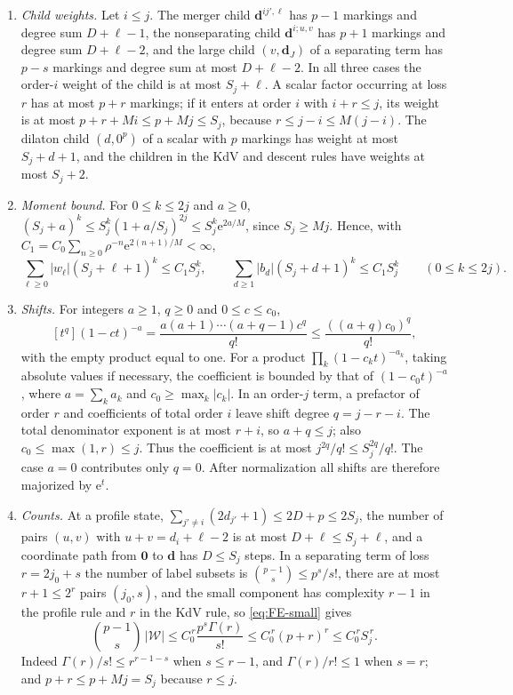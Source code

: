 \begin{enumerate}[label=(\alph*),leftmargin=*]
\item\emph{Child weights.} Let $i\le j$. The merger child
$\mathbf d^{ij',\ell}$ has $p-1$ markings and degree sum $D+\ell-1$, the
nonseparating child $\mathbf d^{i;u,v}$ has $p+1$ markings and degree
sum $D+\ell-2$, and the large child $(v,\mathbf d_J)$ of a separating
term has $p-s$ markings and degree sum at most $D+\ell-2$. In all three
cases the order-$i$ weight of the child is at most $S_j+\ell$. A scalar
factor occurring at loss $r$ has at most $p+r$ markings; if it enters at
order $i$ with $i+r\le j$, its weight is at most $p+r+Mi\le p+Mj\le S_j$,
because $r\le j-i\le M(j-i)$. The dilaton child $(d,0^p)$ of a scalar
with $p$ markings has weight at most $S_j+d+1$, and the children in the
KdV and descent rules have weights at most $S_j+2$.
\item\emph{Moment bound.} For $0\le k\le2j$ and $a\ge0$,
$(S_j+a)^k\le S_j^k(1+a/S_j)^{2j}\le S_j^k\mathrm{e}^{2a/M}$, since
$S_j\ge Mj$. Hence, with
$C_1=C_0\sum_{n\ge0}\rho^{-n}\mathrm{e}^{2(n+1)/M}<\infty$,
\begin{equation}
 \sum_{\ell\ge0}|w_\ell|(S_j+\ell+1)^k\le C_1S_j^k,\qquad
 \sum_{d\ge1}|b_d|(S_j+d+1)^k\le C_1S_j^k\qquad(0\le k\le2j).
 \label{eq:FE-moment}
\end{equation}
\item\emph{Shifts.} For integers $a\ge1$, $q\ge0$ and $0\le c\le c_0$,
\[
 [t^q](1-ct)^{-a}=\frac{a(a+1)\cdots(a+q-1)c^q}{q!}
 \le\frac{((a+q)c_0)^q}{q!},
\]
with the empty product equal to one. For a product
$\prod_k(1-c_kt)^{-a_k}$, taking absolute values if necessary, the
coefficient is bounded by that of $(1-c_0t)^{-a}$, where
$a=\sum_k a_k$ and $c_0\ge\max_k|c_k|$. In an order-$j$ term, a
prefactor of order $r$ and coefficients of total order $i$ leave shift
degree $q=j-r-i$. The total denominator exponent is at most $r+i$,
so $a+q\le j$; also $c_0\le\max(1,r)\le j$. Thus the coefficient is
at most $j^{2q}/q!\le S_j^{2q}/q!$. The case $a=0$ contributes only
$q=0$. After normalization all shifts are therefore majorized by
$\mathrm{e}^{t}$.
\item\emph{Counts.} At a profile state, $\sum_{j'\ne i}(2d_{j'}+1)\le
2D+p\le2S_j$, the number of pairs $(u,v)$ with $u+v=d_i+\ell-2$ is at
most $D+\ell\le S_j+\ell$, and a coordinate path from $\mathbf0$ to
$\mathbf d$ has $D\le S_j$ steps. In a separating term of loss
$r=2j_0+s$ the number of label subsets is $\binom{p-1}s\le p^s/s!$,
there are at most $r+1\le2^r$ pairs $(j_0,s)$, and the small component
has complexity $r-1$ in the profile rule and $r$ in the KdV rule, so
\eqref{eq:FE-small} gives
\begin{equation}
 \binom{p-1}{s}\,|\mathcal W|\le C_0^{\,r}\frac{p^s\Gamma(r)}{s!}
 \le C_0^{\,r}(p+r)^r\le C_0^{\,r}S_j^{\,r}.
 \label{eq:FE-count}
\end{equation}
Indeed $\Gamma(r)/s!\le r^{r-1-s}$ when $s\le r-1$, and $\Gamma(r)/r!\le1$
when $s=r$; and $p+r\le p+Mj=S_j$ because $r\le j$.
\end{enumerate}

